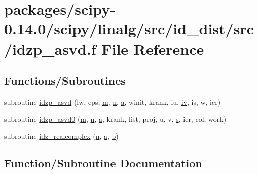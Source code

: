 \hypertarget{idzp__asvd_8f}{}\section{packages/scipy-\/0.14.0/scipy/linalg/src/id\+\_\+dist/src/idzp\+\_\+asvd.f File Reference}
\label{idzp__asvd_8f}
\subsection*{Functions/\+Subroutines}
\begin{DoxyCompactItemize}
\item 
subroutine \hyperlink{idzp__asvd_8f_ab301235735e5f4737acd8c08298e3c89}{idzp\+\_\+asvd} (lw, eps, \hyperlink{indexexpr_8h_ab72fdb4031d47b75ab26dd18a437bcdc}{m}, \hyperlink{indexexpr_8h_ab427e2e2b4d6cec55fa088ea2a692ace}{n}, \hyperlink{gen__mat5files_8m_aae328bf20413f220e38aec4d95bfd6da}{a}, winit, krank, iu, \hyperlink{cephes_8h_ad4b28607832b258aa453374d01dfe8c5}{iv}, is, w, ier)
\item 
subroutine \hyperlink{idzp__asvd_8f_a3b971782b62d399602a8037b75a4c13d}{idzp\+\_\+asvd0} (\hyperlink{indexexpr_8h_ab72fdb4031d47b75ab26dd18a437bcdc}{m}, \hyperlink{indexexpr_8h_ab427e2e2b4d6cec55fa088ea2a692ace}{n}, \hyperlink{gen__mat5files_8m_aae328bf20413f220e38aec4d95bfd6da}{a}, krank, list, proj, u, v, \hyperlink{indexexpr_8h_ae024b0db549122b44c349ae28ec990dc}{s}, ier, col, work)
\item 
subroutine \hyperlink{idzp__asvd_8f_a69e3a41ab013f215ced8b3d6db47e77c}{idz\+\_\+realcomplex} (\hyperlink{indexexpr_8h_ab427e2e2b4d6cec55fa088ea2a692ace}{n}, \hyperlink{gen__mat5files_8m_aae328bf20413f220e38aec4d95bfd6da}{a}, \hyperlink{gen__mat5files_8m_a7b38767b3b6a8dae167e5afa4fc340b0}{b})
\end{DoxyCompactItemize}


\subsection{Function/\+Subroutine Documentation}
\hypertarget{idzp__asvd_8f_a69e3a41ab013f215ced8b3d6db47e77c}{}
